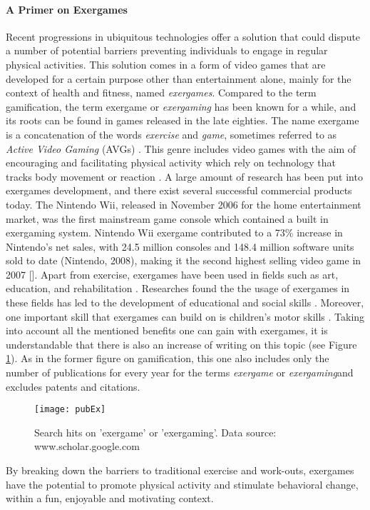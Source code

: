 \paragraph{A Primer on Exergames}
Recent progressions in ubiquitous technologies offer a solution that could dispute a number of potential barriers preventing individuals to engage in regular physical activities. This solution comes in a form of video games that are developed for a certain purpose other than entertainment alone, mainly for the context of health and fitness, named \textit{exergames}. Compared to the term gamification, the term exergame or \textit{exergaming} has been known for a while, and its roots can be found in games released in the late eighties. The name exergame is a concatenation of the words \textit{exercise} and \textit{game}, sometimes referred to as \textit{Active Video Gaming} (AVGs) \cite{altamimi2012survey}. This genre includes video games with the aim of encouraging and facilitating physical activity which rely on technology that tracks body movement or reaction \cite{altamimi2012survey}. A large amount of research has been put into exergames development, and there exist several successful commercial
products today. The Nintendo Wii, released in November 2006 for the home entertainment market,
was the first mainstream game console which contained a built in exergaming system. Nintendo Wii exergame contributed to a
73\% increase in Nintendo's net sales, with 24.5 million consoles and 148.4 million software units sold to date (Nintendo, 2008), making it the second highest selling video game in 2007 [].%
Apart from exercise, exergames have been used in fields such as art, education, and rehabilitation  \cite{altamimi2012survey}. Researches found the the usage of exergames in these fields has led to the 
development of educational and social skills \cite{altamimi2012survey}. Moreover, one important skill that exergames can build on is children's motor skills \cite{delgado2009low}. Taking into account all the mentioned benefits one can gain with exergames, it is understandable that there is also an increase of writing on this topic (see 
Figure \ref{fig:pubEx}). As in the former figure on gamification, this one also includes only the number of publications for every year for the terms \textit{exergame} or \textit{exergaming}and excludes patents and citations. 
\begin{figure}[h]
    \centering
    \texttt{[image: pubEx]}
    \caption{Search hits on 'exergame' or 'exergaming'. Data source: www.scholar.google.com}
    \label{fig:pubEx}
\end{figure}
By breaking down the barriers to traditional exercise and work-outs, exergames have the potential to promote physical
activity and stimulate behavioral change, within a fun, enjoyable and motivating context.
